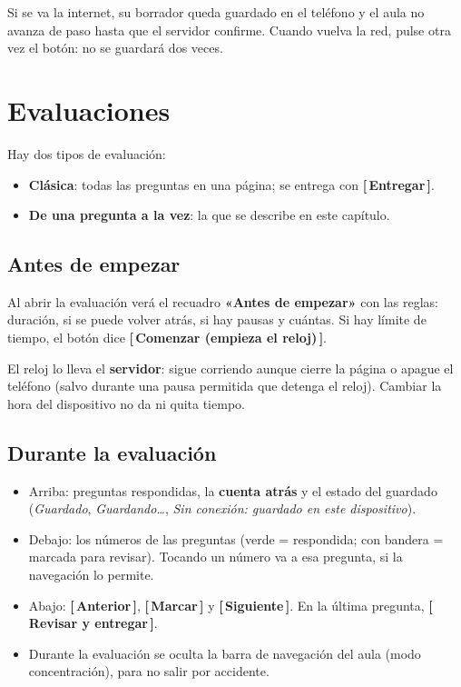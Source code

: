 \documentclass[11pt,a4paper,oneside]{book}
\newcommand{\boton}[1]{\textsf{\textbf{[\,#1\,]}}}
\begin{document}
\begin{nota}
Si se va la internet, su borrador queda guardado en el teléfono y el aula no avanza de paso hasta que el servidor
confirme. Cuando vuelva la red, pulse otra vez el botón: no se guardará dos veces.
\end{nota}

\chapter{Evaluaciones}

Hay dos tipos de evaluación:
\begin{itemize}
  \item \textbf{Clásica}: todas las preguntas en una página; se entrega con \boton{Entregar}.
  \item \textbf{De una pregunta a la vez}: la que se describe en este capítulo.
\end{itemize}

\section{Antes de empezar}
Al abrir la evaluación verá el recuadro \textbf{«Antes de empezar»} con las reglas: duración, si se puede volver
atrás, si hay pausas y cuántas. Si hay límite de tiempo, el botón dice \boton{Comenzar (empieza el reloj)}.

\begin{importante}
El reloj lo lleva el \textbf{servidor}: sigue corriendo aunque cierre la página o apague el teléfono (salvo durante
una pausa permitida que detenga el reloj). Cambiar la hora del dispositivo no da ni quita tiempo.
\end{importante}

\section{Durante la evaluación}
\begin{itemize}
  \item Arriba: preguntas respondidas, la \textbf{cuenta atrás} y el estado del guardado
        (\emph{Guardado}, \emph{Guardando\dots}, \emph{Sin conexión: guardado en este dispositivo}).
  \item Debajo: los números de las preguntas (verde = respondida; con bandera = marcada para revisar). Tocando un
        número va a esa pregunta, si la navegación lo permite.
  \item Abajo: \boton{Anterior}, \boton{Marcar} y \boton{Siguiente}. En la última pregunta,
        \boton{Revisar y entregar}.
  \item Durante la evaluación se oculta la barra de navegación del aula (modo concentración), para no salir por
        accidente.
\end{itemize}
\end{document}
